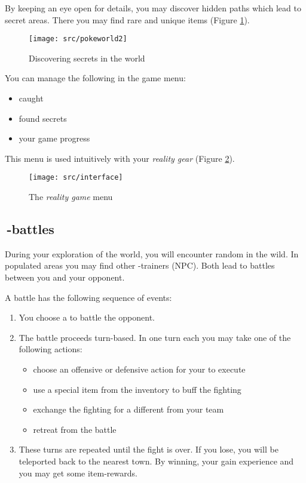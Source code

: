 By keeping an eye open for details, you may discover hidden paths which lead to secret areas. There you may find rare \poke{} and unique items (Figure \ref{secrets}).

\begin{figure}[!ht]
\begin{center}
\texttt{[image: src/pokeworld2]}
\end{center}
\caption[Discovering secrets in the \pokeT{} world]{Discovering secrets in the \poke{} world}
\label{secrets}
\end{figure}

You can manage the following in the game menu:
\begin{itemize}
\item caught \poke{}
\item found secrets
\item your game progress
\end{itemize}
This menu is used intuitively with your \emph{\poke{} reality gear} (Figure \ref{menu}).

\begin{figure}[!ht]
\begin{center}
\texttt{[image: src/interface]}
\end{center}
\caption[The \emph{\pokeT{} reality game} menu]{The \emph{\poke{} reality game} menu}
\label{menu}
\end{figure}

\subsection[\pokeT{}-battles]{\poke{}\,-battles}
During your exploration of the \poke{} world, you will encounter random \poke{} in the wild. In populated areas you may find other \poke{}-trainers (NPC). Both lead to \poke{} battles between you and your opponent.

A battle has the following sequence of events:
\begin{enumerate}
\item You choose a \poke{} to battle the opponent.
\item The battle proceeds turn-based. In one turn each you may take one of the following actions:
\begin{itemize}
\item choose an offensive or defensive action for your \poke{} to execute
\item use a special item from the inventory to buff the fighting \poke{}
\item exchange the fighting \poke{} for a different \poke{} from your team
\item retreat from the battle
\end{itemize}
\item These turns are repeated until the fight is over. If you lose, you will be teleported back to the nearest town. By winning, your \poke{} gain experience and you may get some item-rewards.
\end{enumerate}

